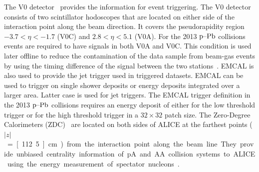 The V0 detector~\cite{forwarddetectorsTdr} provides the information for event triggering. The V0 detector consists of two scintillator hodoscopes that are located on either side of the interaction point along the beam direction. It covers the pseudorapidity region $-3.7 < \eta < -1.7$ (V0C) and $2.8 < \eta < 5.1$ (V0A). For the 2013 $\mbox{p--Pb}$ collisions events are required to have signals in both V0A and V0C. This condition is used later offline to reduce the contamination of the data sample from beam-gas events by using the timing difference of the signal between the two stations~\cite{alicePerformance}.
EMCAL is also used to provide the jet trigger used in triggered datasets. EMCAL can be used to trigger on single shower deposits or energy deposits integrated over a larger area. Latter case is used for jet triggers. The EMCAL trigger definition in the 2013 $\mbox{p--Pb}$ collisions requires an energy deposit of either \unit[10]{\gev}  for the low threshold trigger or \unit[20]{\gev} for the high threshold trigger in a $32\times32$ patch size.
The Zero-Degree Calorimeters (ZDC)~\cite{PUDDU2007397} are located on both sides of ALICE at the farthest points ($|z|$~=~\unit[112.5]{cm}) from the interaction point along the beam line. They provide unbiased centrality information of pA and AA collision systems to ALICE using the energy measurement of spectator nucleons~\cite{Adam:2014qja,Abelev:2013qoq}.



